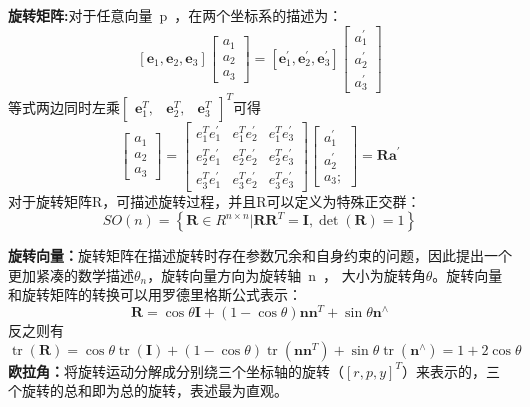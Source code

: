\textbf{旋转矩阵:}对于任意向量{~p~}，在两个坐标系的描述为：
\begin{equation}
  \left[\mathbf{e}_{1}, \mathbf{e}_{2}, \mathbf{e}_{3}\right]\left[\begin{array}{l}{a_{1}} \\ {a_{2}} \\ {a_{3}}\end{array}\right]=\left[\mathbf{e}_{1}^{\prime}, \mathbf{e}_{2}^{\prime}, \mathbf{e}_{3}^{\prime}\right]\left[\begin{array}{c}{a_{1}^{\prime}} \\ {a_{2}^{\prime}} \\ {a_{3}^{\prime}}\end{array}\right]
\end{equation}
等式两边同时左乘$\left[\begin{array}{ccc}{\mathbf{e}_{1}^{T},} & {\mathbf{e}_{2}^{T},} & {\mathbf{e}_{3}^{T}}\end{array}\right]^{T}$可得
\begin{equation}
\left[\begin{array}{l}{a_{1}} \\ {a_{2}} \\ {a_{3}}\end{array}\right]=\left[\begin{array}{lll}{e_{1}^{T} e_{1}^{\prime}} & {e_{1}^{T} e_{2}^{\prime}} & {e_{1}^{T} e_{3}^{\prime}} \\ {e_{2}^{T} e_{1}^{\prime}} & {e_{2}^{T} e_{2}^{\prime}} & {e_{2}^{T} e_{3}^{\prime}} \\ {e_{3}^{T} e_{1}^{\prime}} & {e_{3}^{T} e_{2}^{\prime}} & {e_{3}^{T} e_{3}^{\prime}}\end{array}\right]\left[\begin{array}{c}{a_{1}^{\prime}} \\ {a_{2}^{\prime}} \\ {a_{3} ;}\end{array}\right]=\mathbf{R a}^{\prime}
\end{equation}
对于旋转矩阵R，可描述旋转过程，并且R可以定义为特殊正交群：
\begin{equation}
  S O(n)=\left\{\mathbf{R} \in R^{n \times n} | \mathbf{R} \mathbf{R}^{T}=\mathbf{I}, \operatorname{det}(\mathbf{R})=1\right\}
\end{equation}

\textbf{旋转向量：}旋转矩阵在描述旋转时存在参数冗余和自身约束的问题，因此提出一个更加紧凑的数学描述$\theta_{n}$，旋转向量方向为旋转轴{~n~}，
大小为旋转角$\theta$。旋转向量和旋转矩阵的转换可以用罗德里格斯公式表示：
\begin{equation}
  \mathbf{R}=\cos \theta \mathbf{I}+(1-\cos \theta) \mathbf{n} \mathbf{n}^{T}+\sin \theta \mathbf{n}^{\wedge}
\end{equation}
反之则有
\begin{equation}
  \operatorname{tr}(\mathbf{R})=\cos \theta \operatorname{tr}(\mathbf{I})+(1-\cos \theta) \operatorname{tr}\left(\mathbf{n} \mathbf{n}^{T}\right)+\sin \theta \operatorname{tr}\left(\mathbf{n}^{\wedge}\right)=1+2 \cos \theta
\end{equation}
\textbf{欧拉角：}将旋转运动分解成分别绕三个坐标轴的旋转（$[r, p, y]^{T}$）来表示的，三个旋转的总和即为总的旋转，表述最为直观。

